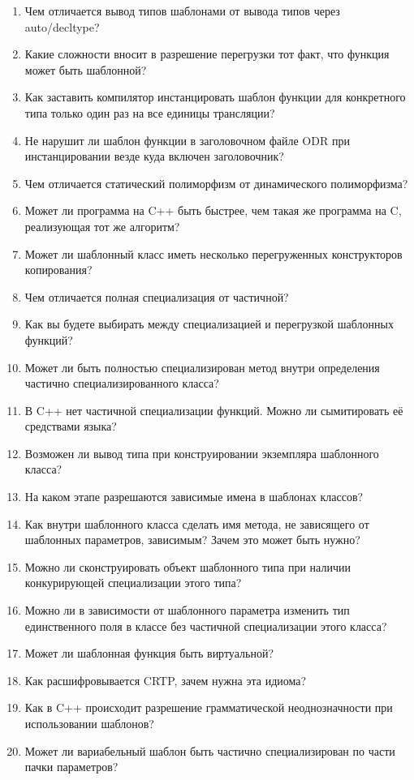\documentclass[a4paper,12pt,oneside]{article}
\begin{document}
\begin{enumerate}
\item Чем отличается вывод типов шаблонами от вывода типов через auto/decltype?
\item Какие сложности вносит в разрешение перегрузки тот факт, что функция может быть шаблонной?
\item Как заставить компилятор инстанцировать шаблон функции для конкретного типа только один раз на все единицы трансляции?
\item Не нарушит ли шаблон функции в заголовочном файле ODR при инстанцировании везде куда включен заголовочник?
\item Чем отличается статический полиморфизм от динамического полиморфизма?
\item Может ли программа на C++ быть быстрее, чем такая же программа на C, реализующая тот же алгоритм?
\item Может ли шаблонный класс иметь несколько перегруженных конструкторов копирования?
\item Чем отличается полная специализация от частичной?
\item Как вы будете выбирать между специализацией и перегрузкой шаблонных функций?
\item Может ли быть полностью специализирован метод внутри определения частично специализированного класса?
\item В C++ нет частичной специализации функций. Можно ли сымитировать её средствами языка?
\item Возможен ли вывод типа при конструировании экземпляра шаблонного класса?
\item На каком этапе разрешаются зависимые имена в шаблонах классов?
\item Как внутри шаблонного класса сделать имя метода, не зависящего от шаблонных параметров, зависимым? Зачем это может быть нужно?
\item Можно ли сконструировать объект шаблонного типа при наличии конкурирующей специализации этого типа?
\item Можно ли в зависимости от шаблонного параметра изменить тип единственного поля в классе без частичной специализации этого класса?
\item Может ли шаблонная функция быть виртуальной?
\item Как расшифровывается CRTP, зачем нужна эта идиома?
\item Как в C++ происходит разрешение грамматической неоднозначности при использовании шаблонов?
\item Может ли вариабельный шаблон быть частично специализирован по части пачки параметров?

\end{enumerate}
\end{document}
